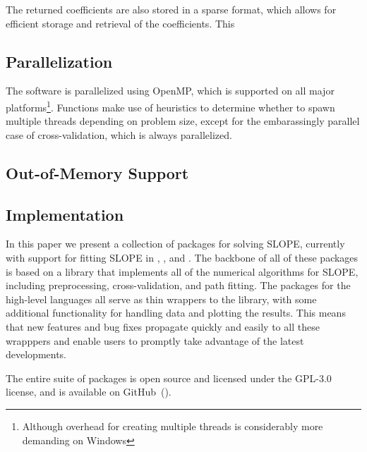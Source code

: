 \documentclass[article]{jss}
\let\Cref\crtCref
\begin{document}
The returned coefficients are also stored in a sparse format, which
allows for efficient storage and retrieval of the coefficients. This

\subsection{Parallelization}

The software is parallelized using OpenMP, which is supported
on all major platforms\footnote{Although overhead for creating
  multiple threads is considerably more demanding on Windows}.
Functions make use of heuristics to determine whether to
spawn multiple threads depending on problem size, except for
the embarassingly parallel case of cross-validation, which is always
parallelized.

\subsection{Out-of-Memory Support}


\subsection{Implementation}

In this paper we present a collection of packages for solving SLOPE, currently
with support for fitting SLOPE in , , and
. The backbone of all of these packages is based on a
 library that implements all of the numerical algorithms for
SLOPE, including preprocessing, cross-validation, and path fitting. The
packages for the high-level languages all serve as thin wrappers to the
 library, with some additional functionality for handling data
and plotting the results. This means that new features and bug fixes propagate
quickly and easily to all these wrapppers and enable users to promptly take
advantage of the latest developments.

The entire suite of packages is open source and licensed under the GPL-3.0 license,
and is available on GitHub~(\Cref{tab:slope-packages}).
\end{document}

